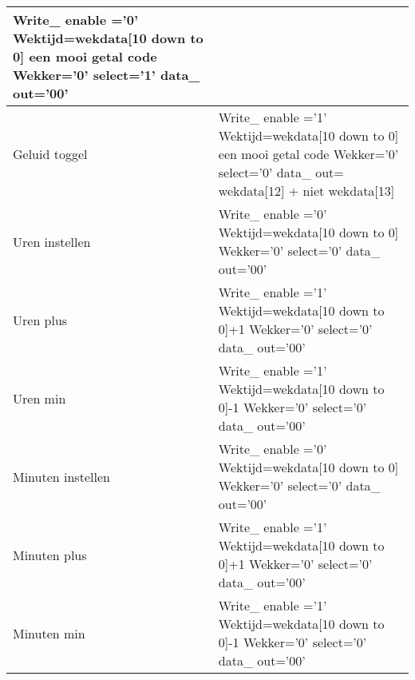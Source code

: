 \documentclass[a4paper, oneside, 10pt]{article}
\begin{document}
\begin{longtable}{|l| p{10cm} |}
Write\_ enable ='0' \newline
Wektijd=wekdata[10 down to 0] een mooi getal code \newline
Wekker='0' \newline
select='1' \newline
data\_ out='00' \\ \hline
Geluid toggel &
Write\_ enable ='1' \newline
Wektijd=wekdata[10 down to 0] een mooi getal code \newline
Wekker='0' \newline
select='0' \newline
data\_ out= wekdata[12] + niet wekdata[13] \\ \hline
Uren instellen &
Write\_ enable ='0' \newline
Wektijd=wekdata[10 down to 0] \newline
Wekker='0' \newline
select='0' \newline
data\_ out='00' \\ \hline
Uren plus &
Write\_ enable ='1' \newline
Wektijd=wekdata[10 down to 0]+1 \newline
Wekker='0' \newline
select='0' \newline
data\_ out='00' \\ \hline
Uren min &
Write\_ enable ='1' \newline
Wektijd=wekdata[10 down to 0]-1 \newline
Wekker='0' \newline
select='0' \newline
data\_ out='00' \\ \hline
Minuten instellen &
Write\_ enable ='0' \newline
Wektijd=wekdata[10 down to 0] \newline
Wekker='0' \newline
select='0' \newline
data\_ out='00' \\ \hline
Minuten plus &
Write\_ enable ='1' \newline
Wektijd=wekdata[10 down to 0]+1 \newline
Wekker='0' \newline
select='0' \newline
data\_ out='00' \\ \hline
Minuten min &
Write\_ enable ='1' \newline
Wektijd=wekdata[10 down to 0]-1 \newline
Wekker='0' \newline
select='0' \newline
data\_ out='00' \\ \hline
\end{longtable}
\end{document}
